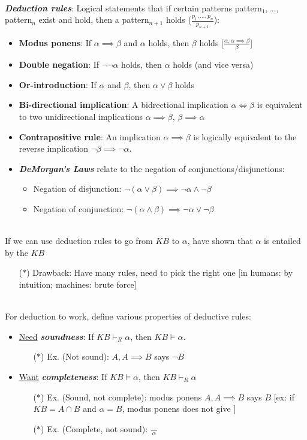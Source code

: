 \documentclass[12pt]{extarticle}
\theoremstyle{definition}
\theoremstyle{remark}
\newcommand{\pstart}[0]{\noindent}
\newcommand{\newp}[0]{~\\ \pstart}
\newcommand{\term}[1]{\noindent\textbf{\textit{#1}}}
\begin{document}
~\\ \pstart
\term{Deduction rules}: Logical statements that if certain patterns pattern$_1,\hdots,$ pattern$_n$ exist and hold, then a pattern$_{n+1}$ holds ($\frac{p_1,\hdots,p_n}{p_{n+1}}$): \begin{itemize}
    \item \textbf{Modus ponens}: If $\alpha\implies\beta$ and $\alpha$ holds, then $\beta$ holds [$\frac{\alpha,\alpha\implies\beta} {\beta}$]
    \item \textbf{Double negation}: If $\neg\neg\alpha$ holds, then $\alpha$ holds (and vice versa)
    \item \textbf{Or-introduction}: If $\alpha$ and $\beta$, then $\alpha\lor\beta$ holds
    \item \textbf{Bi-directional implication}: A bidrectional implication $\alpha\Longleftrightarrow\beta$ is equivalent to two unidirectional implications $\alpha\implies\beta$, $\beta\implies\alpha$
    \item \textbf{Contrapositive rule}: An implication $\alpha\implies\beta$ is logically equivalent to the reverse implication $\neg\beta\implies\neg\alpha$.
    \item \term{DeMorgan's Laws} relate to the negation of conjunctions/disjunctions: \begin{itemize}
        \item Negation of disjunction: $\neg(\alpha\lor\beta)\implies\neg\alpha\land\neg\beta$
        \item Negation of conjunction: $\neg(\alpha\land\beta)\implies\neg\alpha\lor\neg\beta$
    \end{itemize}
\end{itemize}

\newp
If we can use deduction rules to go from $KB$ to $\alpha$, have shown that $\alpha$ is entailed by the $KB$ \begin{itemize}
    \item[($\ast$)] Drawback: Have many rules, need to pick the right one [in humans: by intuition; machines: brute force]
\end{itemize}

\newp
For deduction to work, define various properties of deductive rules: \begin{itemize}
    \item \ul{Need} \term{soundness}: If $KB\vdash_R\alpha$, then $KB\models\alpha$. \begin{itemize}
        \item[($\ast$)] Ex. (Not sound): $A,A\implies B$ says $\neg B$
    \end{itemize}
    \item \ul{Want} \term{completeness}: If $KB\models\alpha$, then $KB\vdash_R\alpha$  \begin{itemize}
        \item[($\ast$)] Ex. (Sound, not complete): modus ponens $A,A\implies B$ says $B$ [ex: if $KB=A\cap B$ and $\alpha=B$, modus ponens does not give ]
        \item[($\ast$)] Ex. (Complete, not sound): $\frac{\;\;\;~}{\alpha}$
    \end{itemize}
\end{itemize}
\end{document}
